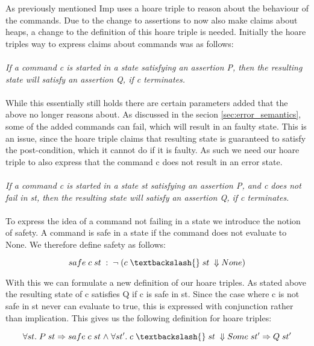 \label{sec:hoare_triple}
As previously mentioned Imp uses a hoare triple to reason about the behaviour of the commands. Due to the change to assertions to now also make claims about heaps, a change to the definition of this hoare triple is needed. Initially the hoare triples way to express claims about commands was as follows:
\\
\\
\textit{If a command c is started in a state satisfying an assertion P, then the resulting state will satisfy an assertion Q, if c terminates.}
\\
\\
While this essentially still holds there are certain parameters added that the above no longer reasons about. As discussed in the secion \ref{sec:error_semantics}, some of the added commands can fail, which will result in an faulty state. This is an issue, since the hoare triple claims that resulting state is guaranteed to satisfy the post-condition, which it cannot do if it is faulty. As such we need our hoare triple to also express that the command c does not result in an error state.
\\
\\
\textit{If a command c is started in a state st satisfying an assertion P, and c does not fail in st, then the resulting state will satisfy an assertion Q, if c terminates.}
\\
\\

To express the idea of a command not failing in a state we introduce the notion of safety. A command is safe in a state if the command does not evaluate to None. We therefore define safety as follows:

\[safe\;c\;st\;: \;\neg \;(c \;\textbackslash{}\;st\;\Downarrow None)\]

With this we can formulate a new definition of our hoare triples. As stated above the resulting state of c satisfies Q if c is safe in st. Since the case where c is not safe in st never can evaluate to true, this is expressed with conjunction rather than implication. This gives us the following definition for hoare triples:

\[
\forall st.\; P\;st \impl safe\;c\;st \land \forall st'. \;c\;\textbackslash{}\;st\;\Downarrow Some\; st' \impl Q\;st'
\]	